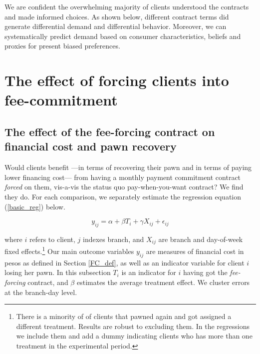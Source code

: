 \documentclass[oneside,11pt]{article}
\begin{document}
We are confident the overwhelming majority of clients understood the contracts and made informed choices. As shown below, different contract terms did generate differential demand and differential behavior. Moreover, we can systematically predict demand based on consumer characteristics, beliefs and proxies for present biased preferences.



\section{The effect of forcing clients into fee-commitment} \label{fee-commitment}



\subsection{The effect of the fee-forcing contract on financial cost and pawn recovery} \label{TE_fee-forcing}

Would clients benefit ---in terms of recovering their pawn and in terms of paying lower financing cost--- from having a monthly payment commitment contract \textit{forced} on them, vis-a-vis the status quo pay-when-you-want contract? We find they do. For each comparison, we separately estimate the regression equation (\ref{basic_reg}) below.

\begin{equation} \label{basic_reg}
    y_{ij} = \alpha + \beta T_{i} + \gamma X_{ij} + \epsilon_{ij}
\end{equation}

\noindent where $i$ refers to client, $j$ indexes branch, and $X_{ij}$ are branch and day-of-week fixed effects.\footnote{There is a minority of of clients that pawned again and got assigned a different treatment. Results are robust to excluding them. In the regressions we include them and add a dummy indicating clients who has more than one treatment in the experimental period.} %
Our main outcome variables $y_{ij}$ are measures of financial cost in pesos as defined in Section \ref{FC_def}, as well as an indicator variable for client $i$ losing her pawn. In this subsection $T_{i}$ is an indicator for $i$ having got the \textit{fee-forcing} contract, and $\beta$ estimates the average treatment effect. We cluster errors at the branch-day level.%
\end{document}
